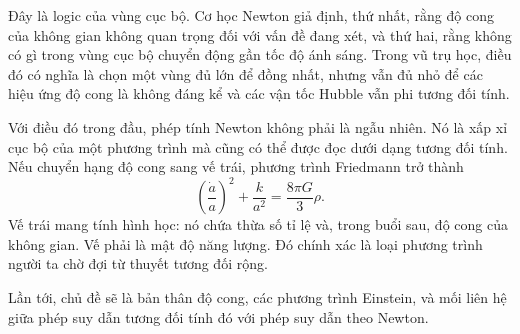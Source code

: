 \begin{classroomqa}
\end{classroomqa}

\begin{classroomqa}
\end{classroomqa}

Đây là logic của vùng cục bộ. Cơ học Newton giả định, thứ nhất, rằng độ cong của không gian không quan trọng đối với vấn đề đang xét, và thứ hai, rằng không có gì trong vùng cục bộ chuyển động gần tốc độ ánh sáng. Trong vũ trụ học, điều đó có nghĩa là chọn một vùng đủ lớn để đồng nhất, nhưng vẫn đủ nhỏ để các hiệu ứng độ cong là không đáng kể và các vận tốc Hubble vẫn phi tương đối tính.

Với điều đó trong đầu, phép tính Newton không phải là ngẫu nhiên. Nó là xấp xỉ cục bộ của một phương trình mà cũng có thể được đọc dưới dạng tương đối tính. Nếu chuyển hạng độ cong sang vế trái, phương trình Friedmann trở thành
\begin{equation}
\left(\frac{\dot a}{a}\right)^2+\frac{k}{a^2}=\frac{8\pi G}{3}\rho.
\end{equation}
Vế trái mang tính hình học: nó chứa thừa số tỉ lệ và, trong buổi sau, độ cong của không gian. Vế phải là mật độ năng lượng. Đó chính xác là loại phương trình người ta chờ đợi từ thuyết tương đối rộng.

Lần tới, chủ đề sẽ là bản thân độ cong, các phương trình Einstein, và mối liên hệ giữa phép suy dẫn tương đối tính đó với phép suy dẫn theo Newton.